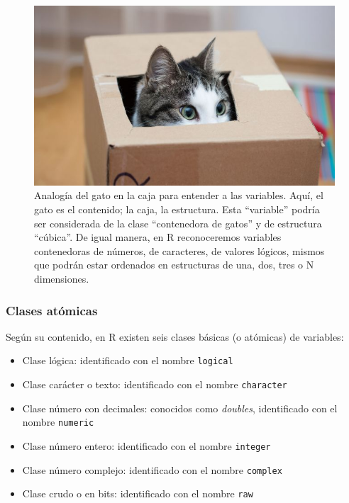 \documentclass[
]{article}
\providecommand{\tightlist}{%
  \setlength{\itemsep}{0pt}\setlength{\parskip}{0pt}}
\theoremstyle{definition}
\theoremstyle{definition}
\theoremstyle{definition}
\theoremstyle{definition}
\theoremstyle{remark}
\begin{document}
\begin{figure}

{\centering \includegraphics[width=1\linewidth]{figs/fotografias/gatobox} 

}

\caption{Analogía del gato en la caja para entender a las variables. Aquí, el gato es el contenido; la caja, la estructura. Esta ``variable'' podría ser considerada de la clase ``contenedora de gatos'' y de estructura ``cúbica''. De igual manera, en R reconoceremos variables contenedoras de números, de caracteres, de valores lógicos, mismos que podrán estar ordenados en estructuras de una, dos, tres o N dimensiones.}\label{fig:figura43}
\end{figure}

\hypertarget{clases-atuxf3micas}{%
\subsubsection{Clases atómicas}\label{clases-atuxf3micas}}

Según su contenido, en R existen seis clases básicas (o atómicas) de variables:

\begin{itemize}
\tightlist
\item
  Clase lógica: identificado con el nombre \texttt{logical}
\item
  Clase carácter o texto: identificado con el nombre \texttt{character}
\item
  Clase número con decimales: conocidos como \emph{doubles}, identificado con el nombre \texttt{numeric}
\item
  Clase número entero: identificado con el nombre \texttt{integer}
\item
  Clase número complejo: identificado con el nombre \texttt{complex}
\item
  Clase crudo o en bits: identificado con el nombre \texttt{raw}
\end{itemize}
\end{document}
